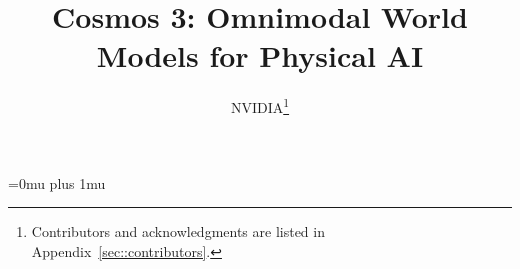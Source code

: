 \documentclass[10pt,logo,copyright]{nvidiatechreport}
\title{Cosmos 3: Omnimodal World Models for Physical AI}
\author{NVIDIA\footnote{Contributors and acknowledgments are listed in Appendix~\ref{sec::contributors}.}}
\begin{document}
\maketitle
\abscontent



\newpage
\tableofcontents
\newpage










\clearpage
\appendix










\clearpage
\begingroup
\raggedright
\sloppy
\makeatletter
\renewcommand{\bibsection}{%
  \par\noindent{\headingfont\refname}\par\vspace{5pt}%
}
\setlength{\bibhang}{0pt}
\renewcommand\@bibsetup[1]{%
  \setlength{\leftmargin}{0pt}%
  \setlength{\itemindent}{0pt}%
  \setlength{\labelwidth}{0pt}%
  \setlength{\labelsep}{0pt}%
  \setlength{\listparindent}{0pt}%
  \setlength{\itemsep}{\bibsep}%
  \setlength{\parsep}{\z@}%
}
\makeatother
\setlength{\emergencystretch}{3em}
\Urlmuskip=0mu plus 1mu\relax


\endgroup
\end{document}
